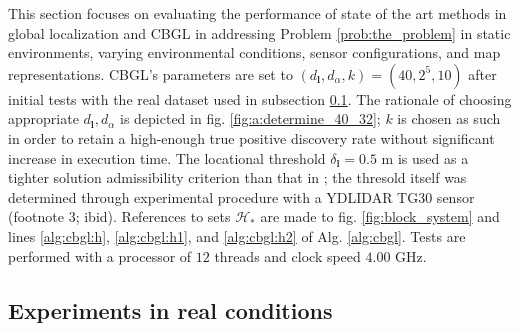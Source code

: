 This section focuses on evaluating the performance of state of the art methods
in global localization and CBGL in addressing Problem \ref{prob:the_problem} in
static environments, varying environmental
conditions, sensor configurations, and map representations. CBGL's
parameters are set to $(d_{\bm{l}},d_{\alpha},k) = (40, 2^5, 10)$
after initial tests with the real dataset used in subsection
\ref{subsec:exp_a}. The rationale of choosing appropriate
$d_{\bm{l}},d_{\alpha}$ is depicted in fig. \ref{fig:a:determine_40_32};
$k$ is chosen as such in order to retain a high-enough true positive discovery
rate without significant increase in execution time. The locational threshold
$\delta_{\bm{l}} = 0.5$ m is used as a tighter solution admissibility criterion
than that in \cite{Filotheou2022g}; the thresold itself was
determined through experimental procedure with a YDLIDAR TG30 sensor (footnote
3; ibid).
References to sets $\mathcal{H}_{\ast}$ are made to fig. \ref{fig:block_system}
and lines
\ref{alg:cbgl:h}, \ref{alg:cbgl:h1}, and \ref{alg:cbgl:h2} of
Alg.  \ref{alg:cbgl}.
Tests are performed with a processor of $12$ threads and clock speed $4.00$ GHz.


\subsection{Experiments in real conditions}
\label{subsec:exp_a}

